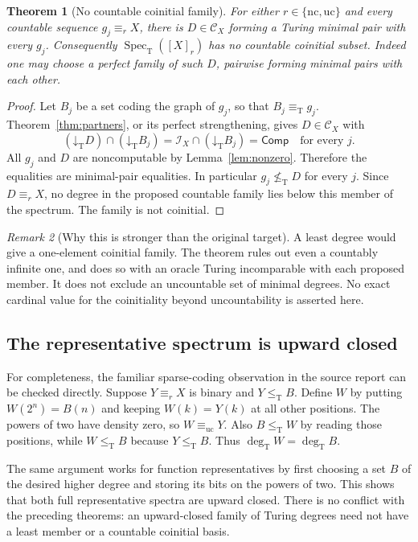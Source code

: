 \documentclass[11pt,a4paper]{article}
\newcommand{\leT}{\leq_{\mathrm T}}
\newcommand{\nleT}{\nleq_{\mathrm T}}
\newcommand{\eqT}{\equiv_{\mathrm T}}
\newcommand{\degT}{\operatorname{deg}_{\mathrm T}}
\newcommand{\nc}{\mathrm{nc}}
\newcommand{\uc}{\mathrm{uc}}
\newcommand{\CD}{\mathcal C}
\newcommand{\core}{\mathcal I}
\newcommand{\Comp}{\mathsf{Comp}}
\newcommand{\low}[1]{\mathord\downarrow_{\!\mathrm T}#1}
\newcommand{\Spec}{\operatorname{Spec}_{\mathrm T}}
\newtheorem{theorem}{Theorem}[section]
\theoremstyle{definition}\newtheorem{definition}[theorem]{Definition}
\theoremstyle{remark}\newtheorem{remark}[theorem]{Remark}
\begin{document}
\begin{theorem}[No countable coinitial family]\label{thm:coinitial}
For either $r\in\{\nc,\uc\}$ and every countable sequence
$g_j\equiv_r X$, there is $D\in\CD_X$ forming a Turing minimal pair with
every $g_j$. Consequently $\Spec([X]_r)$ has no countable coinitial subset.
Indeed one may choose a perfect family of such $D$, pairwise forming minimal
pairs with each other.
\end{theorem}
\begin{proof}
Let $B_j$ be a set coding the graph of $g_j$, so that $B_j\eqT g_j$.
Theorem~\ref{thm:partners}, or its perfect strengthening, gives $D\in\CD_X$
with
\[
 (\low D)\cap(\low {B_j})
   =\core_X\cap(\low {B_j})=\Comp
 \quad\text{for every }j.
\]
All $g_j$ and $D$ are noncomputable by Lemma~\ref{lem:nonzero}. Therefore the
equalities are minimal-pair equalities. In particular $g_j\nleT D$ for every
$j$. Since $D\equiv_r X$, no degree in the proposed countable family lies
below this member of the spectrum. The family is not coinitial.
\end{proof}

\begin{remark}[Why this is stronger than the original target]
A least degree would give a one-element coinitial family. The theorem rules
out even a countably infinite one, and does so with an oracle Turing
incomparable with each proposed member. It does not exclude an uncountable
set of minimal degrees. No exact cardinal value for the coinitiality beyond
uncountability is asserted here.
\end{remark}

\subsection{The representative spectrum is upward closed}
For completeness, the familiar sparse-coding observation in the source
report can be checked directly. Suppose $Y\equiv_r X$ is binary and
$Y\leT B$. Define $W$ by putting $W(2^n)=B(n)$ and keeping $W(k)=Y(k)$ at
all other positions. The powers of two have density zero, so
$W\equiv_{\uc}Y$. Also $B\leT W$ by reading those positions, while
$W\leT B$ because $Y\leT B$. Thus $\degT W=\degT B$.

The same argument works for function representatives by first choosing a
set $B$ of the desired higher degree and storing its bits on the powers of
two. This shows that both full representative spectra are upward closed.
There is no conflict with the preceding theorems: an upward-closed family of
Turing degrees need not have a least member or a countable coinitial basis.
\end{document}
